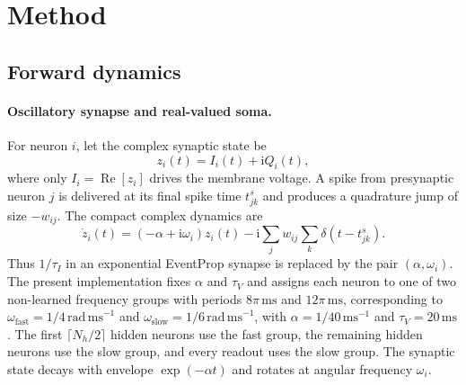 \section{Method}
\label{sec:method}

\subsection{Forward dynamics}
\label{sec:forward-dynamics}

\paragraph{Oscillatory synapse and real-valued soma.}
For neuron $i$, let the complex synaptic state be
\begin{equation}
    z_i(t)=I_i(t)+\mathrm{i}Q_i(t),
\end{equation}
where only $I_i=\operatorname{Re}[z_i]$ drives the membrane voltage. A spike
from presynaptic neuron $j$ is delivered at its final spike time $t^s_{jk}$
and produces a quadrature jump of size $-w_{ij}$. The compact complex dynamics
are
\begin{equation}
    \dot z_i(t)=\left(-\alpha+\mathrm{i}\omega_i\right)z_i(t)
    -\mathrm{i}\sum_j w_{ij}\sum_k\delta\!\left(t-t^s_{jk}\right).
    \label{eq:tes-complex-synapse}
\end{equation}
Thus $1/\tau_I$ in an exponential EventProp synapse is replaced by the pair
$(\alpha,\omega_i)$. The present implementation fixes $\alpha$ and $\tau_V$
and assigns each neuron to one of two non-learned frequency groups with periods
$8\pi\,\mathrm{ms}$ and $12\pi\,\mathrm{ms}$, corresponding to
$\omega_{\mathrm{fast}}=1/4\,\mathrm{rad\,ms}^{-1}$ and
$\omega_{\mathrm{slow}}=1/6\,\mathrm{rad\,ms}^{-1}$, with
$\alpha=1/40\,\mathrm{ms}^{-1}$ and $\tau_V=20\,\mathrm{ms}$. The first
$\lceil N_h/2\rceil$ hidden neurons use the fast group, the remaining hidden
neurons use the slow group, and every readout uses the slow group. The synaptic
state decays with envelope
$\exp(-\alpha t)$ and rotates at angular frequency $\omega_i$.

